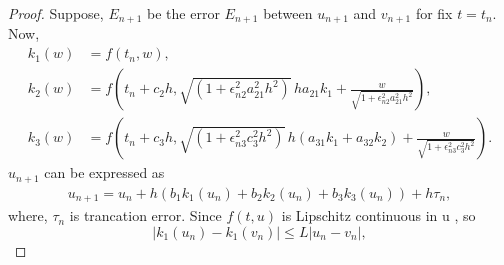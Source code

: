 \documentclass[10pt,a4paper]{amsart}
\begin{document}
\begin{proof} Suppose, $E_{n+1}$ be the error $E_{n+1}$  between $u_{n+1}$ and $v_{n+1}$ for fix $t = t_n$. Now,
\begin{align*}
k_1(w) &= f(t_n, w), \\
k_2(w) &= f\left(t_n + c_2h, \sqrt{(1 + \epsilon_{n2}^2 a_{21}^2 h^2)} \,  h a_{21}k_1 + \frac{w} {\sqrt{1 + \epsilon_{n2}^2 a_{21}^2 h^2}}\right), \\
k_3(w) &= f\left(t_n + c_3h, \sqrt{(1 + \epsilon_{n3}^2 c_{3}^2 h^2)} \, h (a_{31}k_1 + a_{32}k_2)+\frac{w} {\sqrt{1 + \epsilon_{n3}^2 c_3^2 h^2}}\right).
\end{align*}
$u_{n+1}$ can be expressed as
\begin{align*}
 u_{n+1} = u_n + h (b_1k_1(u_n) + b_2k_2(u_n) + b_3k_3(u_n)) + h \tau_n,
\end{align*}
where, $\tau_n$ is trancation error.
 Since $f(t,u)$ is Lipschitz continuous in u , so
 \begin{equation*}
     |k_1(u_n) - k_1(v_n)|\leq L|u_n - v_n|,
 \end{equation*}


\end{proof}
\end{document}
